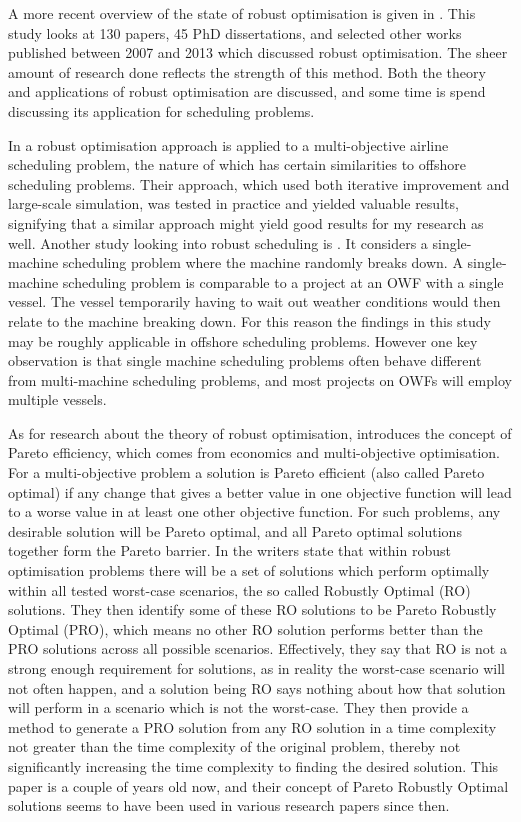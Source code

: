 \documentclass[a4paper,12pt]{article}
\begin{document}
\bigskip

A more recent overview of the state of robust optimisation is given in \cite{gabrel2014recent}. This study looks at 130 papers, 45 PhD dissertations, and selected other works published between 2007 and 2013 which discussed robust optimisation. The sheer amount of research done reflects the strength of this method. Both the theory and applications of robust optimisation are discussed, and some time is spend discussing its application for scheduling problems. 

In \cite{burke2010multi} a robust optimisation approach is applied to a multi-objective airline scheduling problem, the nature of which has certain similarities to offshore scheduling problems. Their approach, which used both iterative improvement and large-scale simulation, was tested in practice and yielded valuable results, signifying that a similar approach might yield good results for my research as well. 
Another study looking into robust scheduling is \cite{goren2008robustness}. It considers a single-machine scheduling problem where the machine randomly breaks down. A single-machine scheduling problem is comparable to a project at an OWF with a single vessel. The vessel temporarily having to wait out weather conditions would then relate to the machine breaking down. For this reason the findings in this study may be roughly applicable in offshore scheduling problems. However one key observation is that single machine scheduling problems often behave different from multi-machine scheduling problems, and most projects on OWFs will employ multiple vessels. 

As for research about the theory of robust optimisation, \cite{iancu2013pareto} introduces the concept of Pareto efficiency, which comes from economics and multi-objective optimisation. For a multi-objective problem a solution is Pareto efficient (also called Pareto optimal) if any change that gives a better value in one objective function will lead to a worse value in at least one other objective function. For such problems, any desirable solution will be Pareto optimal, and all Pareto optimal solutions together form the Pareto barrier. In \cite{iancu2013pareto} the writers state that within robust optimisation problems there will be a set of solutions which perform optimally within all tested worst-case scenarios, the so called Robustly Optimal (RO) solutions. They then identify some of these RO solutions to be Pareto Robustly Optimal (PRO), which means no other RO solution performs better than the PRO solutions across all possible scenarios. Effectively, they say that RO is not a strong enough requirement for solutions, as in reality the worst-case scenario will not often happen, and a solution being RO says nothing about how that solution will perform in a scenario which is not the worst-case. They then provide a method to generate a PRO solution from any RO solution in a time complexity not greater than the time complexity of the original problem, thereby not significantly increasing the time complexity to finding the desired solution. This paper is a couple of years old now, and their concept of Pareto Robustly Optimal solutions seems to have been used in various research papers since then. 
\end{document}
